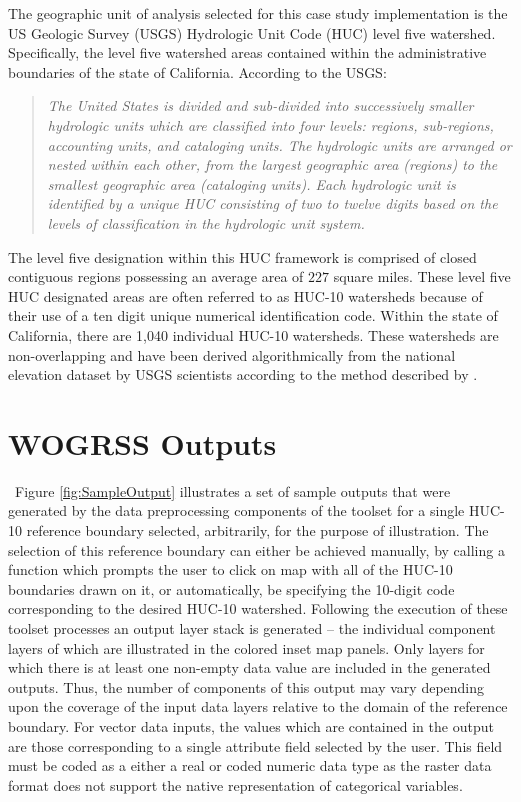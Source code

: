     The geographic unit of analysis selected for this case study implementation is the US Geologic Survey (USGS) Hydrologic Unit Code (HUC) level five watershed. Specifically, the level five watershed areas contained within the administrative boundaries of the state of California. According to the USGS: 
    \blockquote{\textit{The United States is divided and sub-divided into successively smaller hydrologic units which are classified into four levels: regions, sub-regions, accounting units, and cataloging units. The hydrologic units are arranged or nested within each other, from the largest geographic area (regions) to the smallest geographic area (cataloging units). Each hydrologic unit is identified by a unique HUC consisting of two to twelve digits based on the levels of classification in the hydrologic unit system. \cite{Seaber1987}}}
    The level five designation within this HUC framework is comprised of closed contiguous regions possessing an average area of $227$ square miles. These level five HUC designated areas are often referred to as HUC-10 watersheds because of their use of a ten digit unique numerical identification code. Within the state of California, there are 1,040 individual HUC-10 watersheds. These watersheds are non-overlapping and have been derived algorithmically from the national elevation dataset by USGS scientists according to the method described by \cite{Seaber1987}.
    
\section{WOGRSS Outputs}
    
    ~Figure \ref{fig:SampleOutput} illustrates a set of sample outputs that were generated by the data preprocessing components of the toolset for a single HUC-10 reference boundary selected, arbitrarily, for the purpose of illustration. The selection of this reference boundary can either be achieved manually, by calling a function which prompts the user to click on map with all of the HUC-10 boundaries drawn on it, or automatically, be specifying the 10-digit code corresponding to the desired HUC-10 watershed. Following the execution of these toolset processes an output layer stack is generated -- the individual component layers of which are illustrated in the colored inset map panels. Only layers for which there is at least one non-empty data value are included in the generated outputs. Thus, the number of components of this output may vary depending upon the coverage of the input data layers relative to the domain of the reference boundary. For vector data inputs, the values which are contained in the output are those corresponding to a single attribute field selected by the user. This field must be coded as a either a real or coded numeric data type as the raster data format does not support the native representation of categorical variables.
    
